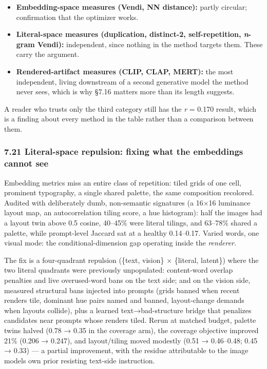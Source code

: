 \documentclass[
  10pt,
]{article}
\providecommand{\tightlist}{%
  \setlength{\itemsep}{0pt}\setlength{\parskip}{0pt}}
\theoremstyle{plain}
\theoremstyle{definition}
\providecommand{\tightlist}{\setlength{\itemsep}{0pt}\setlength{\parskip}{0pt}}
\begin{document}
\begin{itemize}
\tightlist
\item
  \textbf{Embedding-space measures (Vendi, NN distance):} partly
  circular; confirmation that the optimizer works.
\item
  \textbf{Literal-space measures (duplication, distinct-2,
  self-repetition, \emph{n}-gram Vendi):} independent, since nothing in
  the method targets them. These carry the argument.
\item
  \textbf{Rendered-artifact measures (CLIP, CLAP, MERT):} the most
  independent, living downstream of a second generative model the method
  never sees, which is why §7.16 matters more than its length suggests.
\end{itemize}

A reader who trusts only the third category still has the \emph{r} =
0.170 result, which is a finding about every method in the table rather
than a comparison between them.

\subsubsection{7.21 Literal-space repulsion: fixing what the embeddings
cannot
see}\label{721-literal-space-repulsion-fixing-what-the-embeddings-cannot-see}

Embedding metrics miss an entire class of repetition: tiled grids of one
cell, prominent typography, a single shared palette, the same
composition recolored. Audited with deliberately dumb, non-semantic
signatures (a 16×16 luminance layout map, an autocorrelation tiling
score, a hue histogram): half the images had a layout twin above 0.5
cosine, 40--45\% were literal tilings, and 63--78\% shared a palette,
while prompt-level Jaccard sat at a healthy 0.14--0.17. Varied words,
one visual mode: the conditional-dimension gap operating inside the
\emph{renderer}.

The fix is a four-quadrant repulsion (\{text, vision\} × \{literal,
latent\}) where the two literal quadrants were previously unpopulated:
content-word overlap penalties and live overused-word bans on the text
side; and on the vision side, measured structural bans injected into
prompts (grids banned when recent renders tile, dominant hue pairs named
and banned, layout-change demands when layouts collide), plus a learned
text→bad-structure bridge that penalizes candidates near prompts whose
renders tiled. Rerun at matched budget, palette twins halved (0.78 →
0.35 in the coverage arm), the coverage objective improved 21\% (0.206 →
0.247), and layout/tiling moved modestly (0.51 → 0.46--0.48; 0.45 →
0.33) --- a partial improvement, with the residue attributable to the
image model\textquotesingle s own prior resisting text-side instruction.
\end{document}
